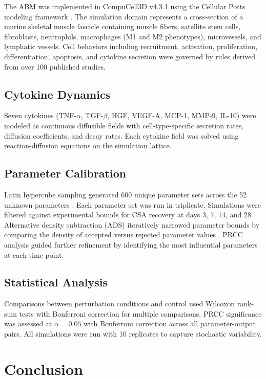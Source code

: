 \documentclass[11pt]{article}
\begin{document}
The ABM was implemented in CompuCell3D v4.3.1 \citep{swat2012multi} using the Cellular Potts modeling framework \citep{graner1992simulation}. The simulation domain represents a cross-section of a murine skeletal muscle fascicle containing muscle fibers, satellite stem cells, fibroblasts, neutrophils, macrophages (M1 and M2 phenotypes), microvessels, and lymphatic vessels. Cell behaviors including recruitment, activation, proliferation, differentiation, apoptosis, and cytokine secretion were governed by rules derived from over 100 published studies.

\subsection{Cytokine Dynamics}

Seven cytokines (TNF-$\alpha$, TGF-$\beta$, HGF, VEGF-A, MCP-1, MMP-9, IL-10) were modeled as continuous diffusible fields with cell-type-specific secretion rates, diffusion coefficients, and decay rates. Each cytokine field was solved using reaction-diffusion equations on the simulation lattice.

\subsection{Parameter Calibration}

Latin hypercube sampling generated 600 unique parameter sets across the 52 unknown parameters \citep{mckay1979comparison}. Each parameter set was run in triplicate. Simulations were filtered against experimental bounds for CSA recovery at days 3, 7, 14, and 28. Alternative density subtraction (ADS) iteratively narrowed parameter bounds by comparing the density of accepted versus rejected parameter values \citep{marino2008methodology}. PRCC analysis guided further refinement by identifying the most influential parameters at each time point.

\subsection{Statistical Analysis}

Comparisons between perturbation conditions and control used Wilcoxon rank-sum tests with Bonferroni correction for multiple comparisons. PRCC significance was assessed at $\alpha = 0.05$ with Bonferroni correction across all parameter-output pairs. All simulations were run with 10 replicates to capture stochastic variability.

\section{Conclusion}
\end{document}
